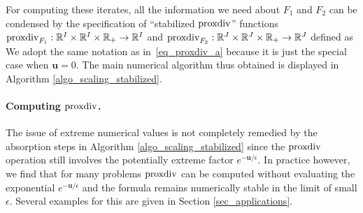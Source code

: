 For computing these iterates, all the information we need about $F_1$ and $F_2$ can be condensed by the specification of ``stabilized $\operatorname{proxdiv}$'' functions $\operatorname{proxdiv}_{F_1} : \mathbb{R}^I\times \mathbb{R}^I \times \mathbb{R}_+ \to \mathbb{R}^I$ and $\operatorname{proxdiv}_{F_2} : \mathbb{R}^J\times \mathbb{R}^J \times \mathbb{R}_+ \to \mathbb{R}^J$ defined as
We adopt the same notation as in~\eqref{eq_proxdiv_a} because it is just the special case when $\mathbf{u}=0$.
The main numerical algorithm thus obtained is displayed in Algorithm \ref{algo_scaling_stabilized}.

\paragraph{Computing $\operatorname{proxdiv}$.}
The issue of extreme numerical values is not completely remedied by the absorption steps in Algorithm \ref{algo_scaling_stabilized} since the $\operatorname{proxdiv}$ operation still involves the potentially extreme factor $e^{-\mathbf{u}/\epsilon}$. In practice however, we find that for many problems $\operatorname{proxdiv}$ can be computed without evaluating the exponential $e^{-\mathbf{u}/\epsilon}$ and the formula remains numerically stable in the limit of small $\epsilon$. Several examples for this are given in Section \ref{sec_applications}.

